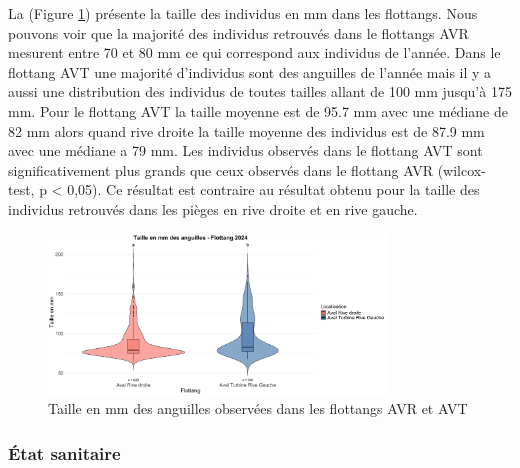 \documentclass[11pt,titlepage,twoside]{article}\usepackage[]{graphicx}\usepackage[table]{xcolor}
\begin{document}
La (Figure \ref{taille_flottang_oral}) présente la taille des individus en mm dans les flottangs. Nous pouvons voir que la majorité des individus retrouvés dans le flottangs AVR mesurent entre 70 et 80 mm ce qui correspond aux individus de l’année. Dans le flottang AVT une majorité d’individus sont des anguilles de l’année mais il y a aussi une distribution des individus de toutes tailles allant de 100 mm jusqu’à 175 mm. Pour le flottang AVT la taille moyenne est de 95.7 mm avec une médiane de 82 mm alors quand rive droite la taille moyenne des individus est de 87.9 mm avec une médiane a 79 mm. Les individus observés dans le flottang AVT sont significativement plus grands que ceux observés dans le flottang AVR (wilcox-test, p < 0,05). Ce résultat est contraire au résultat obtenu pour la taille des individus retrouvés dans les pièges en rive droite et en rive gauche.

\begin{figure}[htpb]
\centering
\includegraphics[width=0.8\textwidth]{taille_flottang_oral.png}
\caption{Taille en mm des anguilles observées dans les flottangs AVR et AVT}
\label{taille_flottang_oral}
\end{figure} 

\subsubsection{État sanitaire }
\end{document}
